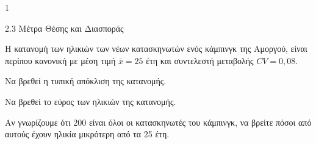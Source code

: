 \begin{ylh}{1}
    \item 2.3 Μέτρα Θέσης και Διασποράς
\end{ylh}
Η κατανομή των ηλικιών των νέων κατασκηνωτών ενός κάμπινγκ της Αμοργού, είναι περίπου κανονική με μέση τιμή $\bar{x} = 25$ έτη και συντελεστή μεταβολής $CV = 0,08$.
\begin{alist}
    \item Να βρεθεί η τυπική απόκλιση της κατανομής. 
    \item Να βρεθεί το εύρος των ηλικιών της κατανομής. 
    \item Αν γνωρίζουμε ότι 200 είναι όλοι οι κατασκηνωτές του κάμπινγκ, να βρείτε πόσοι από αυτούς έχουν ηλικία μικρότερη από τα 25 έτη. 
\end{alist}

